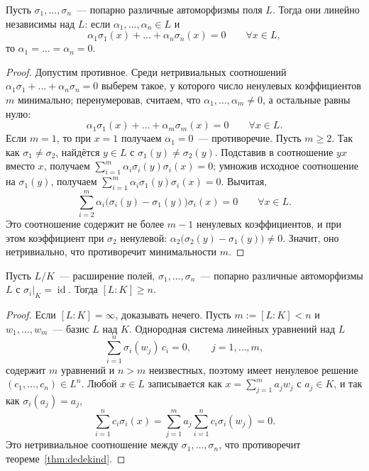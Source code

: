 \documentclass[12pt]{article}
\begin{document}
	\begin{theorem}\label{thm:dedekind}
		Пусть $\sigma_1, \ldots, \sigma_n$~--- попарно различные автоморфизмы поля $L$. Тогда они линейно независимы над $L$: если $\alpha_1, \ldots, \alpha_n \in L$ и
		\[
			\alpha_1\sigma_1(x) + \ldots + \alpha_n\sigma_n(x) = 0 \qquad \forall x \in L,
		\]
		то $\alpha_1 = \ldots = \alpha_n = 0$.
	\end{theorem}
	\begin{proof}
		Допустим противное. Среди нетривиальных соотношений $\alpha_1\sigma_1 + \ldots + \alpha_n\sigma_n = 0$ выберем такое, у которого число ненулевых коэффициентов $m$ минимально; перенумеровав, считаем, что $\alpha_1, \ldots, \alpha_m \ne 0$, а остальные равны нулю:
		\[
			\alpha_1\sigma_1(x) + \ldots + \alpha_m\sigma_m(x) = 0 \qquad \forall x \in L.
		\]
		Если $m = 1$, то при $x = 1$ получаем $\alpha_1 = 0$~--- противоречие. Пусть $m \geqslant 2$. Так как $\sigma_1 \ne \sigma_2$, найдётся $y \in L$ с $\sigma_1(y) \ne \sigma_2(y)$. Подставив в соотношение $yx$ вместо $x$, получаем $\sum_{i=1}^m \alpha_i\sigma_i(y)\sigma_i(x) = 0$; умножив исходное соотношение на $\sigma_1(y)$, получаем $\sum_{i=1}^m \alpha_i\sigma_1(y)\sigma_i(x) = 0$. Вычитая,
		\[
			\sum_{i=2}^m \alpha_i\bigl(\sigma_i(y) - \sigma_1(y)\bigr)\sigma_i(x) = 0 \qquad \forall x \in L.
		\]
		Это соотношение содержит не более $m-1$ ненулевых коэффициентов, и при этом коэффициент при $\sigma_2$ ненулевой: $\alpha_2\bigl(\sigma_2(y) - \sigma_1(y)\bigr) \ne 0$. Значит, оно нетривиально, что противоречит минимальности $m$.
	\end{proof}

	\begin{corollary}\label{cor:aut-count-bound}
		Пусть $L/K$~--- расширение полей, $\sigma_1, \ldots, \sigma_n$~--- попарно различные автоморфизмы $L$ с $\sigma_i|_K = \operatorname{id}$. Тогда $[L:K] \geqslant n$.
	\end{corollary}
	\begin{proof}
		Если $[L:K] = \infty$, доказывать нечего. Пусть $m := [L:K] < n$ и $w_1, \ldots, w_m$~--- базис $L$ над $K$. Однородная система линейных уравнений над $L$
		\[
			\sum_{i=1}^n \sigma_i(w_j)\,c_i = 0, \qquad j = 1, \ldots, m,
		\]
		содержит $m$ уравнений и $n > m$ неизвестных, поэтому имеет ненулевое решение $(c_1, \ldots, c_n) \in L^n$. Любой $x \in L$ записывается как $x = \sum_{j=1}^m a_jw_j$ с $a_j \in K$, и так как $\sigma_i(a_j) = a_j$,
		\[
			\sum_{i=1}^n c_i\sigma_i(x) = \sum_{j=1}^m a_j \sum_{i=1}^n c_i\sigma_i(w_j) = 0.
		\]
		Это нетривиальное соотношение между $\sigma_1, \ldots, \sigma_n$, что противоречит теореме~\ref{thm:dedekind}.
	\end{proof}
\end{document}
